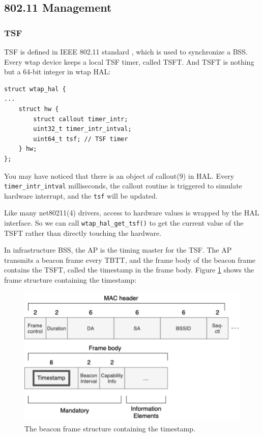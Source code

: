 \documentclass[conference]{IEEEtran}
\begin{document}
\subsection{802.11 Management}
\subsubsection{TSF}
TSF is defined in IEEE 802.11 standard \cite{IEEE80211_2007}, which is used to synchronize a BSS. Every wtap device keeps a local TSF timer, called TSFT. And TSFT is nothing but a 64-bit integer in wtap HAL:

\begin{lstlisting}
struct wtap_hal {
...
    struct hw {
        struct callout timer_intr;
        uint32_t timer_intr_intval;
        uint64_t tsf; // TSF timer
    } hw;
};
\end{lstlisting}

You may have noticed that there is an object of callout(9) in HAL. Every \lstinline{timer_intr_intval} milliseconds, the callout routine is triggered to simulate hardware interrupt, and the \lstinline{tsf} will be updated.

Like many net80211(4) drivers, access to hardware values is wrapped by the HAL interface. So we can call \lstinline{wtap_hal_get_tsf()} to get the current value of the TSFT rather than directly touching the hardware.

In infrastructure BSS, the AP is the timing master for the TSF. The AP transmits a beacon frame every TBTT, and the frame body of the beacon frame contains the TSFT, called the timestamp in the frame body. Figure \ref{fig:tsf} shows the frame structure containing the timestamp:


\begin{figure}[h]
\includegraphics[scale=0.5]{Beacon.drawio.png}
\caption{The beacon frame structure containing the timestamp.}
\label{fig:tsf}
\end{figure}
\end{document}
